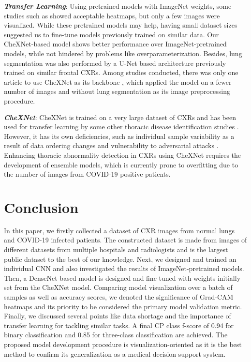 \documentclass{article}
\begin{document}
\textit{\textbf{Transfer Learning}}: Using pretrained models with ImageNet weights, some studies such as \cite{rajaraman2020iteratively} showed acceptable heatmaps, but only a few images were visualized. While these pretrained models may help, having small dataset sizes suggested us to fine-tune models previously trained on similar data. Our CheXNet-based model shows better performance over ImageNet-pretrained models, while not hindered by problems like overparameterization. Besides, lung segmentation was also performed by a U-Net based architecture previously trained on similar frontal CXRs. Among studies conducted, there was only one article to use CheXNet as its backbone \cite{mangal2020covidaid}, which applied the model on a fewer number of images and without lung segmentation as its image preprocessing procedure.

\textit{\textbf{CheXNet}}: CheXNet is trained on a very large dataset of CXRs and has been used for transfer learning by some other thoracic disease identification studies \cite{almuhayar2019classification, sze2019tchexnet}. However, it has its own deficiencies, such as individual sample variability as a result of data ordering changes \cite{zech2019individual} and vulnerability to adversarial attacks \cite{finlayson2018adversarial}. Enhancing thoracic abnormality detection in CXRs using CheXNet requires the development of ensemble models, which is currently prone to overfitting due to the number of images from COVID-19 positive patients.



\section{Conclusion}
In this paper, we firstly collected a dataset of CXR images from normal lungs and COVID-19 infected patients. The constructed dataset is made from images of different datasets from multiple hospitals and radiologists and is the largest public dataset to the best of our knowledge. Next, we designed and trained an individual CNN and also investigated the results of ImageNet-pretrained models. Then, a DenseNet-based model is designed and fine-tuned with weights initially set from the CheXNet model. Comparing model visualization over a batch of samples as well as accuracy scores, we denoted the significance of Grad-CAM heatmaps and its priority to be considered the primary model validation metric. Finally, we discussed several points like data shortage and the importance of transfer learning for tackling similar tasks. A final CP class f-score of 0.94 for binary classification and 0.85 for three-class classification are achieved. The proposed model development procedure is visualization-oriented as it is the best method to confirm its generalization as a medical decision support system.
\end{document}
